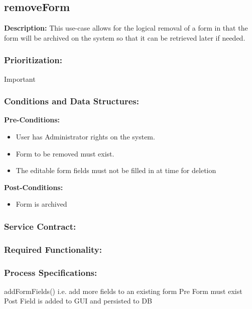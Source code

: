 \subsection{removeForm}
\textbf{Description:}
This use-case allows for the logical removal of a form in that the form will be archived on the system so that it can be retrieved later if needed.
\subsubsection{Prioritization:}
Important
\subsubsection{Conditions and Data Structures:}
\textbf{Pre-Conditions:}
\begin{itemize}
	\item User has Administrator rights on the system.
	\item Form to be removed must exist.
	\item The editable form fields must not be filled in at time for deletion
\end{itemize}

\textbf{Post-Conditions:}	
\begin{itemize}
	\item Form is archived
\end{itemize}
\subsubsection{Service Contract:} 
\subsubsection{Required Functionality:} 
\subsubsection{Process Specifications:} 






addFormFields()
i.e. add more fields to an existing form	
Pre Form must exist	
Post Field is added to GUI and persisted to DB



